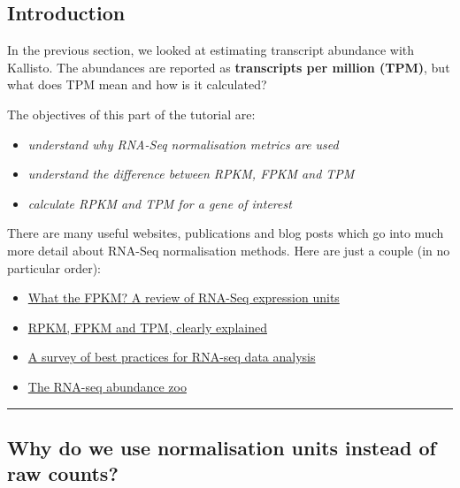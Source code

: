 \documentclass[11pt]{article}
\providecommand{\tightlist}{%
      \setlength{\itemsep}{0pt}\setlength{\parskip}{0pt}}
\begin{document}
\hypertarget{introduction}{%
\subsection{Introduction}\label{introduction}}

In the previous section, we looked at estimating transcript abundance
with Kallisto. The abundances are reported as \textbf{transcripts per
million (TPM)}, but what does TPM mean and how is it calculated?

The objectives of this part of the tutorial are:

\begin{itemize}
\tightlist
\item
  \textit{understand why RNA-Seq normalisation metrics are used}
\item
  \textit{understand the difference between RPKM, FPKM and TPM}
\item
  \textit{calculate RPKM and TPM for a gene of interest}
\end{itemize}

There are many useful websites, publications and blog posts which go
into much more detail about RNA-Seq normalisation methods. Here are just
a couple (in no particular order):

\begin{itemize}
\tightlist
\item
  \href{https://haroldpimentel.wordpress.com/2014/05/08/what-the-fpkm-a-review-rna-seq-expression-units/}{What
  the FPKM? A review of RNA-Seq expression units}
\item
  \href{https://statquest.org/2015/07/09/rpkm-fpkm-and-tpm-clearly-explained/}{RPKM,
  FPKM and TPM, clearly explained}
\item
  \href{https://www.ncbi.nlm.nih.gov/pmc/articles/PMC4728800/}{A survey
  of best practices for RNA-seq data analysis}
\item
  \href{http://robpatro.com/blog/?p=235}{The RNA-seq abundance zoo}
\end{itemize}

    \begin{center}\rule{0.5\linewidth}{.4pt}\end{center}

    \hypertarget{why-do-we-use-normalisation-units-instead-of-raw-counts}{%
\subsection{Why do we use normalisation units instead of raw
counts?}\label{why-do-we-use-normalisation-units-instead-of-raw-counts}}
\end{document}
